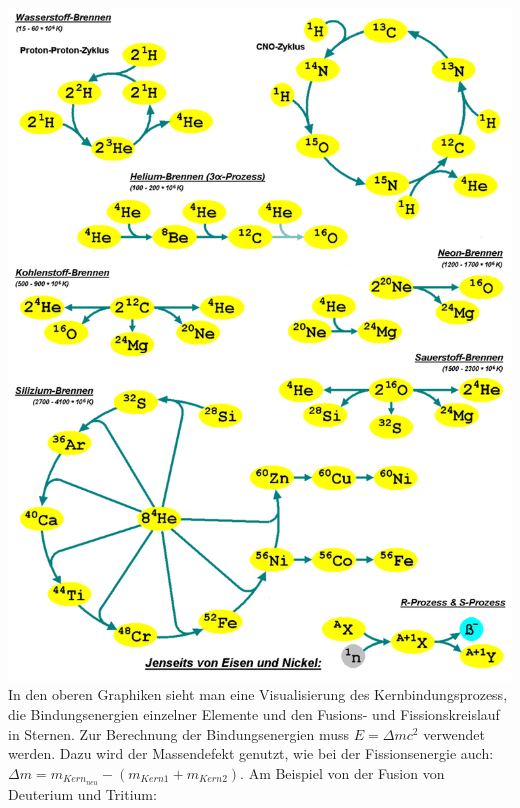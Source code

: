 \documentclass{article}
\begin{document}
        \includegraphics[width=1\textwidth]{graphics/sternzyklus.png} \\
        In den oberen Graphiken sieht man eine Visualisierung des Kernbindungsprozess, die Bindungsenergien einzelner Elemente und
        den Fusions- und Fissionskreislauf in Sternen. Zur Berechnung der Bindungsenergien muss $ E=\Delta mc^2 $ verwendet werden.
        Dazu wird der Massendefekt genutzt, wie bei der Fissionsenergie auch: $\Delta m = m_{Kern_{neu}} - (m_{Kern1} + m_{Kern2})$.
        Am Beispiel von der Fusion von Deuterium und Tritium: 
\end{document}
